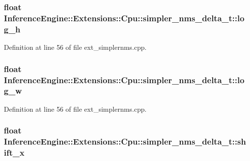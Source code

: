 \subsubsection[{\texorpdfstring{log\+\_\+h}{log_h}}]{\setlength{\rightskip}{0pt plus 5cm}float Inference\+Engine\+::\+Extensions\+::\+Cpu\+::simpler\+\_\+nms\+\_\+delta\+\_\+t\+::log\+\_\+h}\hypertarget{structInferenceEngine_1_1Extensions_1_1Cpu_1_1simpler__nms__delta__t_ac0f620def60fb6979f94630da2ffa79d}{}\label{structInferenceEngine_1_1Extensions_1_1Cpu_1_1simpler__nms__delta__t_ac0f620def60fb6979f94630da2ffa79d}


Definition at line 56 of file ext\+\_\+simplernms.\+cpp.

\subsubsection[{\texorpdfstring{log\+\_\+w}{log_w}}]{\setlength{\rightskip}{0pt plus 5cm}float Inference\+Engine\+::\+Extensions\+::\+Cpu\+::simpler\+\_\+nms\+\_\+delta\+\_\+t\+::log\+\_\+w}\hypertarget{structInferenceEngine_1_1Extensions_1_1Cpu_1_1simpler__nms__delta__t_a1814b4462c79d523288f22337165e63b}{}\label{structInferenceEngine_1_1Extensions_1_1Cpu_1_1simpler__nms__delta__t_a1814b4462c79d523288f22337165e63b}


Definition at line 56 of file ext\+\_\+simplernms.\+cpp.

\subsubsection[{\texorpdfstring{shift\+\_\+x}{shift_x}}]{\setlength{\rightskip}{0pt plus 5cm}float Inference\+Engine\+::\+Extensions\+::\+Cpu\+::simpler\+\_\+nms\+\_\+delta\+\_\+t\+::shift\+\_\+x}\hypertarget{structInferenceEngine_1_1Extensions_1_1Cpu_1_1simpler__nms__delta__t_afc83c32631c8a943fd4d61f0ed6f3872}{}\label{structInferenceEngine_1_1Extensions_1_1Cpu_1_1simpler__nms__delta__t_afc83c32631c8a943fd4d61f0ed6f3872}


